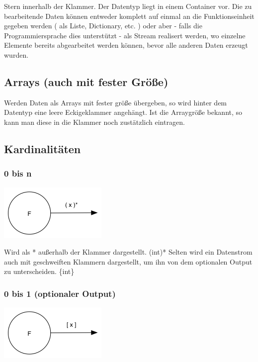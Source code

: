 \documentclass[11pt]{article}
\begin{document}
Stern innerhalb der Klammer.
Der Datentyp liegt in einem Container vor. 
Die zu bearbeitende Daten können entweder komplett auf einmal an die Funktionseinheit gegeben werden ( als Liste, Dictionary, etc. )
oder aber - falls die Programmiersprache dies unterstützt - als Stream realisert werden, wo einzelne Elemente bereits abgearbeitet werden
können, bevor alle anderen Daten erzeugt wurden.

\subsection{Arrays (auch mit fester Größe)}
\label{sec:orgheadline8}
Werden Daten als Arrays mit fester größe übergeben, so wird hinter dem Datentyp eine leere Eckigeklammer angehängt.
Ist die Arraygröße bekannt, so kann man diese in die Klammer noch zustätzlich eintragen.
\subsection{Kardinalitäten}
\label{sec:orgheadline11}
\subsubsection{0 bis n}
\label{sec:orgheadline9}

\includegraphics[width=.9\linewidth]{./img/diagram0n.png}

Wird als * außerhalb der Klammer dargestellt.
(int)*
Selten wird ein Datenstrom auch mit geschweiften Klammern dargestellt, um ihn von dem optionalen Output zu unterscheiden.
\{int\}

\subsubsection{0 bis 1 (optionaler Output)}
\label{sec:orgheadline10}

\includegraphics[width=.9\linewidth]{./img/diagramOptional.png}
\end{document}
